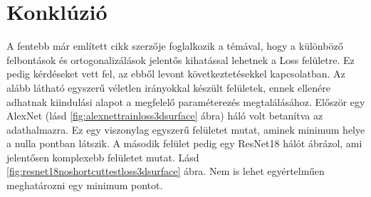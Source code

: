 \documentclass[twoside,a4paper]{refart}
\begin{document}
\section{Konklúzió}
	A fentebb már említett cikk\cite{jae2019VLLoDNN} szerzője foglalkozik a témával, hogy a különböző felbontások és ortogonalizálások jelentős kihatással lehetnek a Loss felületre. Ez pedig kérdéseket vett fel, az ebből levont következtetésekkel kapcsolatban. Az alább látható egyszerű véletlen irányokkal készült felületek, ennek ellenére adhatnak kiindulási alapot a megfelelő paraméterezés megtalálásához. Először egy AlexNet (lásd \ref{fig:alexnettrainloss3dsurface} ábra) háló volt betanítva az adathalmazra. Ez egy viszonylag egyszerű felületet mutat, aminek minimum helye a nulla pontban látszik. A második felület pedig egy ResNet18 hálót ábrázol, ami jelentősen komplexebb felületet mutat. Lásd \ref{fig:resnet18noshortcuttestloss3dsurface} ábra. Nem is lehet egyértelműen meghatározni egy minimum pontot. 
\end{document}
